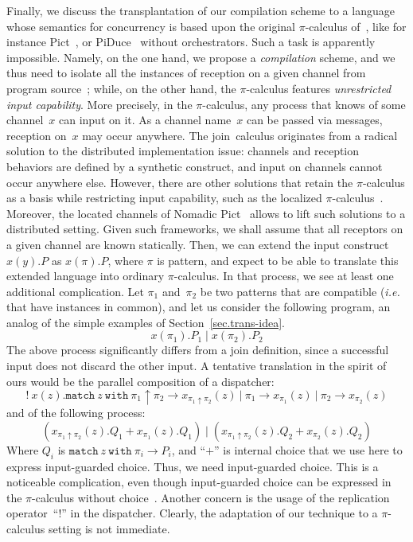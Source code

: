 \documentclass{LMCS}
\makeatletter
\newcommand{\pt}{\pi}
\newcommand{\ie}{\emph{i.e.}\@\xspace}
\newcommand{\lubop}{\mathop{\uparrow}}
\newcommand{\lub}[2]{#1 \lubop #2}
\renewcommand{\_}{\mathord{\rule[-.25ex]{1ex}{.15ex}}}
\makeatother
\begin{document}
Finally, we discuss the transplantation of our compilation scheme to a
language whose semantics for concurrency is based upon the original
$\pi$-calculus of~\cite{MPW92}, like for instance
\textrm{Pict}~\cite{Pict}, or \textrm{PiDuce}~\cite{PiDuce:2005}
without orchestrators.  Such a task is apparently impossible.  Namely,
on the one hand, we propose a \emph{compilation} scheme, and we thus
need to isolate all the instances of reception on a given channel from
program source~; while, on the other hand, the $\pi$-calculus features
\emph{unrestricted input capability}.
More precisely, in the  $\pi$-calculus,
any process that knows of some
channel~$x$ can input on it.  As a channel name~$x$ can be passed via
messages, reception on~$x$ may occur anywhere.  The join~calculus
originates from a radical solution to the distributed implementation
issue: channels and reception behaviors are defined by a synthetic
construct, and input on channels cannot occur anywhere else.  However,
there are other solutions that retain the $\pi$-calculus as a basis
while restricting input capability, such as the localized
$\pi$-calculus~\cite{Merro98asynchrony}.
Moreover, the located channels of Nomadic Pict~\cite{nomadic}
allows to lift such solutions to a distributed setting.
Given such frameworks, we
shall assume that all receptors on a given channel are known
statically.  Then, we can extend the input construct $x(y).P$ as
$x(\pt).P$, where $\pt$ is pattern, and expect to be able to translate
this extended language into ordinary $\pi$-calculus.  In that process,
we see at least one additional complication.  Let $\pt_1$ and~$\pt_2$
be two patterns that are compatible (\ie that have instances in
common), and let us consider the following program, an analog of the
simple examples of Section~\ref{sec.trans-idea}.
$$
x(\pt_1).P_1 \mid x(\pt_2).P_2
$$
The above process significantly differs from a join definition, since
a successful input does not discard the other input.
A tentative translation in the spirit of ours would
be the parallel composition of a dispatcher:
$$
!~x(z).\texttt{match}\ z\ \texttt{with}\
\lub{\pt_1}{\pt_2} \rightarrow x_{\lub{\pt_1}{\pt_2}}(z)\ 
\texttt{|}\ \pt_1 \rightarrow x_{\pt_1}(z)\ 
\texttt{|}\ \pt_2 \rightarrow x_{\pt_2}(z)
$$
and of the following process:
$$
(x_{\lub{\pt_1}{\pt_2}}(z).Q_1 + x_{\pt_1}(z).Q_1) \mid
(x_{\lub{\pt_1}{\pt_2}}(z).Q_2 + x_{\pt_2}(z).Q_2)
$$
Where $Q_i$ is $\texttt{match}~z~\texttt{with}~\pt_i \rightarrow P_i$,
and ``$+$'' is internal choice that we use here to express input-guarded choice.
Thus, we need input-guarded choice.
This is a noticeable complication, even though
input-guarded choice can be expressed
in the $\pi$-calculus without choice~\cite{NestmannPierce00}.
Another concern is the usage of the replication operator~``$!$''
in the dispatcher.
Clearly, the adaptation of our technique to a $\pi$-calculus setting
is not immediate.
\end{document}
